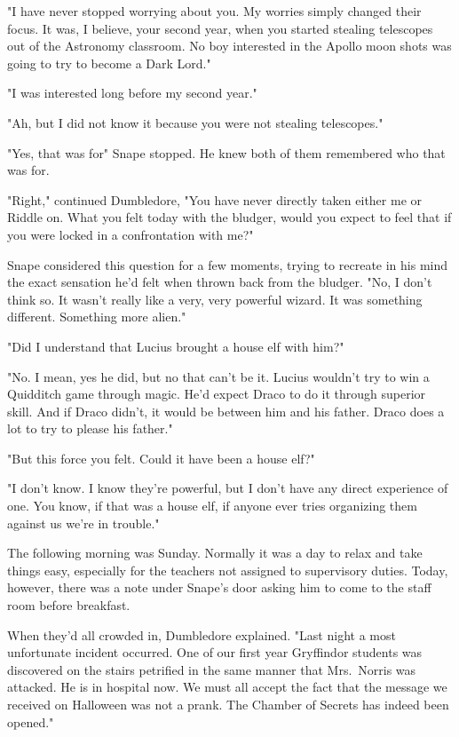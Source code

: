 "I have never stopped worrying about you. My worries simply changed their focus. It was, I believe, your second year, when you started stealing telescopes out of the Astronomy classroom. No boy interested in the Apollo moon shots was going to try to become a Dark Lord."

"I was interested long before my second year."

"Ah, but I did not know it because you were not stealing telescopes."

"Yes, that was for{\el}" Snape stopped. He knew both of them remembered who that was for.

"Right," continued Dumbledore, "You have never directly taken either me or Riddle on. What you felt today with the bludger, would you expect to feel that if you were locked in a confrontation with me?"

Snape considered this question for a few moments, trying to recreate in his mind the exact sensation he'd felt when thrown back from the bludger. "No, I don't think so. It wasn't really like a very, very powerful wizard. It was something different. Something more alien."

"Did I understand that Lucius brought a house elf with him?"

"No. I mean, yes he did, but no that can't be it. Lucius wouldn't try to win a Quidditch game through magic. He'd expect Draco to do it through superior skill. And if Draco didn't, it would be between him and his father. Draco does a lot to try to please his father."

"But this force you felt. Could it have been a house elf?"

"I don't know. I know they're powerful, but I don't have any direct experience of one. You know, if that was a house elf, if anyone ever tries organizing them against us{\el} we're in trouble."

The following morning was Sunday. Normally it was a day to relax and take things easy, especially for the teachers not assigned to supervisory duties. Today, however, there was a note under Snape's door asking him to come to the staff room before breakfast.

When they'd all crowded in, Dumbledore explained. "Last night a most unfortunate incident occurred. One of our first year Gryffindor students was discovered on the stairs petrified in the same manner that Mrs.~Norris was attacked. He is in hospital now. We must all accept the fact that the message we received on Halloween was not a prank. The Chamber of Secrets has indeed been opened."

